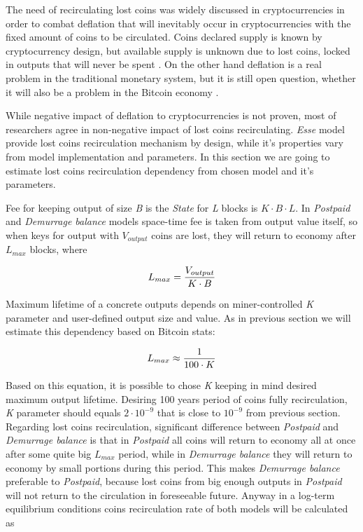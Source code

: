 \documentclass[]{article}   %
\newcommand{\esse}{\textit{Esse}}
\newcommand{\state}{\textit{State}}
\begin{document}
The need of recirculating lost coins was widely discussed in cryptocurrencies \cite{gjermundrod2014recirculating, gjermundrod2016going} in order to combat deflation that will inevitably occur in cryptocurrencies with the fixed amount of coins to be circulated. Coins declared supply is known by cryptocurrency design, but available supply is unknown due to lost coins, locked in outputs that will never be spent \cite{ron2013quantitative}. On the other hand deflation is a real problem in the traditional monetary system, but it is still open question, whether it will also be a problem in the Bitcoin economy \cite{bitcoinDeflationarySpiral, barber2012bitter}.

While negative impact of deflation to cryptocurrencies is not proven, most of researchers agree in non-negative impact of lost coins recirculating. \esse{} model provide lost coins recirculation mechanism by design, while it's properties vary from model implementation and parameters. In this section we are going to estimate lost coins recirculation dependency from chosen model and it's parameters.

Fee for keeping output of size \textit{B} is the \state{} for \textit{L} blocks is ${K \cdot B \cdot L}$. In \textit{Postpaid} and \textit{Demurrage balance} models space-time fee is taken from output value itself, so when keys for output with \textit{$V_{output}$} coins are lost, they will return to economy after \textit{$L_{max}$} blocks, where

\begin{equation}
{L_{max} = {V_{output} \over K \cdot B}}
\end{equation}

Maximum lifetime of a concrete outputs depends on miner-controlled \textit{K} parameter and user-defined output size and value. As in previous section we will estimate this dependency based on Bitcoin stats:

\begin{equation}
{L_{max} \approx {1 \over 100 \cdot K}}
\end{equation}

Based on this equation, it is possible to chose \textit{K} keeping in mind desired maximum output lifetime. Desiring 100 years period of coins fully recirculation, \textit{K} parameter should equals $2 \cdot 10^{-9}$ that is close to $10^{-9}$ from previous section. Regarding lost coins recirculation, significant difference between \textit{Postpaid} and \textit{Demurrage balance} is that in \textit{Postpaid} all coins will return to economy all at once after some quite big $L_{max}$ period, while in \textit{Demurrage balance} they will return to economy by small portions during this period. This makes \textit{Demurrage balance} preferable to \textit{Postpaid}, because lost coins from big enough outputs in \textit{Postpaid} will not return to the circulation in foreseeable future. Anyway in a log-term equilibrium conditions coins recirculation rate of both models will be calculated as
\end{document}
